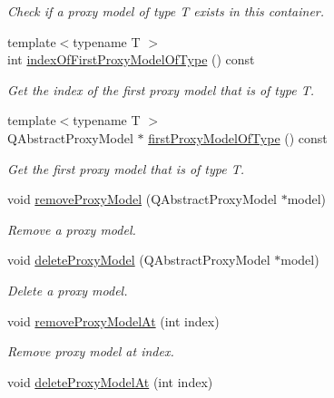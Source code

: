 \begin{DoxyCompactItemize}
\begin{DoxyCompactList}\small\item\em Check if a proxy model of type T exists in this container. \end{DoxyCompactList}\item 
{\footnotesize template$<$typename T $>$ }\\int \hyperlink{class_mdt_1_1_item_model_1_1_proxy_model_container_a6f30c538dbf176178dc19289c36748a4}{index\+Of\+First\+Proxy\+Model\+Of\+Type} () const 
\begin{DoxyCompactList}\small\item\em Get the index of the first proxy model that is of type T. \end{DoxyCompactList}\item 
{\footnotesize template$<$typename T $>$ }\\Q\+Abstract\+Proxy\+Model $\ast$ \hyperlink{class_mdt_1_1_item_model_1_1_proxy_model_container_abf4845094dfd1b48277f01df79bc33d0}{first\+Proxy\+Model\+Of\+Type} () const 
\begin{DoxyCompactList}\small\item\em Get the first proxy model that is of type T. \end{DoxyCompactList}\item 
void \hyperlink{class_mdt_1_1_item_model_1_1_proxy_model_container_a2afbe8121856bfd574243e1b8cee3bdb}{remove\+Proxy\+Model} (Q\+Abstract\+Proxy\+Model $\ast$model)
\begin{DoxyCompactList}\small\item\em Remove a proxy model. \end{DoxyCompactList}\item 
void \hyperlink{class_mdt_1_1_item_model_1_1_proxy_model_container_acaab009c11a74490b652dd3485f3422d}{delete\+Proxy\+Model} (Q\+Abstract\+Proxy\+Model $\ast$model)
\begin{DoxyCompactList}\small\item\em Delete a proxy model. \end{DoxyCompactList}\item 
void \hyperlink{class_mdt_1_1_item_model_1_1_proxy_model_container_a498bf32efbdcf4bd383a05b3926dc04f}{remove\+Proxy\+Model\+At} (int index)
\begin{DoxyCompactList}\small\item\em Remove proxy model at index. \end{DoxyCompactList}\item 
void \hyperlink{class_mdt_1_1_item_model_1_1_proxy_model_container_aec42f1876e851e0ebb3b8dface7911b0}{delete\+Proxy\+Model\+At} (int index)

\end{DoxyCompactItemize}
